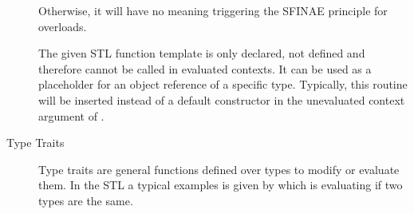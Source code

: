 \documentclass{stdlocal}
\begin{document}
\begin{description}
        Otherwise, it will have no meaning triggering the SFINAE principle for overloads.
      \item[\code{std::declval}]
        The given STL function template is only declared, not defined and therefore cannot be called in evaluated contexts.
        It can be used as a placeholder for an object reference of a specific type.
        Typically, this routine will be inserted instead of a default constructor in the unevaluated context argument of .
      \item[Type Traits]
        Type traits are general functions defined over types to modify or evaluate them.
        In the STL a typical examples is given by  which is evaluating if two types are the same.
    \end{description}
\end{document}
